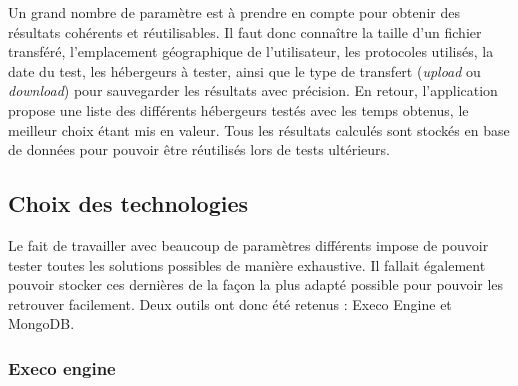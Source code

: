 \documentclass[10pt]{article}
\begin{document}
Un grand nombre de paramètre est à prendre en compte pour obtenir des
résultats cohérents et réutilisables. Il faut donc connaître la taille
d'un fichier transféré, l'emplacement géographique de l'utilisateur, les
protocoles utilisés, la date du test, les hébergeurs à tester, ainsi
que le type de transfert (\textit{upload} ou \textit{download}) pour sauvegarder les
résultats avec précision. En retour, l'application propose une liste
des différents hébergeurs testés avec les temps obtenus, le meilleur
choix étant mis en valeur. Tous les résultats calculés sont stockés en
base de données pour pouvoir être réutilisés lors de tests ultérieurs.
  
\subsection{Choix des technologies}

Le fait de travailler avec beaucoup de paramètres différents impose de
pouvoir tester toutes les solutions possibles de manière
exhaustive. Il fallait également pouvoir stocker ces dernières de la
façon la plus adapté possible pour pouvoir les retrouver
facilement. Deux outils ont donc été retenus : Execo Engine et MongoDB.

\subsubsection{Execo engine}
\end{document}
